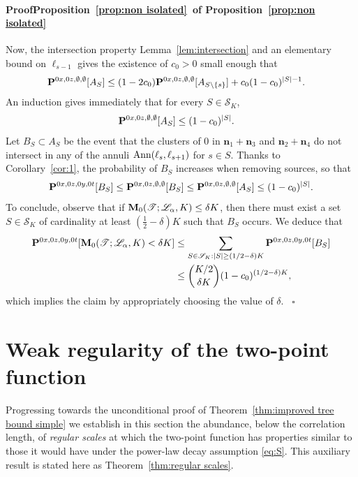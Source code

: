 \documentclass[a4paper,oneside,11pt]{article}
\numberwithin{equation}{section}
\numberwithin{equation}{section}
\numberwithin{equation}{section}
\newenvironment{proof}[1][\relax]%
  {\paragraph{Proof\ifx#1\relax\else~of #1\fi}}%
  {~\hfill$\square$\par\bigskip}
\newcommand{\calS}{\mathcal{S}}
\newcommand{\calT}{\mathcal{T}}
\newcommand{\n}{\mathbf{n}}
\begin{document}
\begin{proof}[Proposition~\ref{prop:non isolated}]
Now,  the intersection property Lemma~\ref{lem:intersection} and an elementary bound on $\ell_{s-1}$ gives the existence of $c_0>0$ small enough that
\begin{align}{\bf P}^{0x,0z,\emptyset,\emptyset}[A_S]
&\le (1-2c_0){\bf P}^{0x,0z,\emptyset,\emptyset}[A_{S\setminus \{s\}}]+c_0(1-c_0)^{|S|-1}.\end{align}
An induction gives immediately that for every $S\in \calS_K$,
\begin{align}\label{eq:bound B}
&{\bf P}^{0x,0z,\emptyset,\emptyset}[A_S]\le (1-c_0)^{|S|}.\end{align}
Let $B_S\subset A_S$ be the event that the clusters of $0$ in $\n_1+\n_3$ and $\n_2+\n_4$ do not intersect in any of the annuli ${\rm Ann}(\ell_{s},\ell_{s+1})$ for $s\in S$.
Thanks to Corollary~\ref{cor:1}, the probability of $B_S$ increases when removing sources, so that
\begin{equation}
{\bf P}^{0x,0z,0y,0t}[B_S]\le {\bf P}^{0x,0z,\emptyset,\emptyset}[B_S]\le{\bf P}^{0x,0z,\emptyset,\emptyset}[A_S]\le (1-c_0)^{|S|}.
\end{equation}
To conclude, observe that if ${\bf M}_0(\calT; \mathcal L_\alpha, K)\le \delta K$, then there must exist a set $S\in \calS_K$ of cardinality at least $(\tfrac12-\delta) K$ such that $B_S$ occurs. We deduce that
\begin{align}{\bf P}^{0x,0z,0y,0t}[{\bf M}_0(\calT; \mathcal L_\alpha, K)< \delta K]
&\le\sum_{S\in\calS_K:
|S|\ge(1/2-\delta)K}{\bf P}^{0x,0z,0y,0t}[B_S]\nonumber \\
&\le \binom{K/2}{\delta K}(1-c_0)^{(1/2-\delta)K},
\end{align}
which implies the claim by appropriately choosing the value of $\delta$.
\end{proof}

\section{Weak regularity of the two-point function} \label{sec:3}


Progressing towards the unconditional proof of Theorem~\ref{thm:improved tree bound simple}  we establish in this section the abundance, below the correlation length, 
of {\em regular scales}  at which the two-point function has properties similar to those it would have under the power-law decay assumption \eqref{eq:S}.   This auxiliary result is stated here as Theorem~\ref{thm:regular scales}. 
\end{document}
